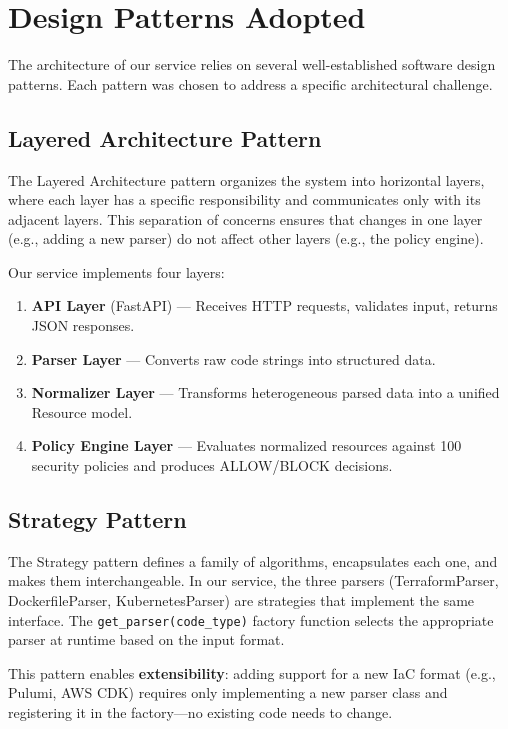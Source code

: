 \section{Design Patterns Adopted}

The architecture of our service relies on several well-established software design patterns. Each pattern was chosen to address a specific architectural challenge.

\subsection{Layered Architecture Pattern}

The Layered Architecture pattern organizes the system into horizontal layers, where each layer has a specific responsibility and communicates only with its adjacent layers. This separation of concerns ensures that changes in one layer (e.g., adding a new parser) do not affect other layers (e.g., the policy engine).

Our service implements four layers:
\begin{enumerate}
    \item \textbf{API Layer} (FastAPI) — Receives HTTP requests, validates input, returns JSON responses.
    \item \textbf{Parser Layer} — Converts raw code strings into structured data.
    \item \textbf{Normalizer Layer} — Transforms heterogeneous parsed data into a unified Resource model.
    \item \textbf{Policy Engine Layer} — Evaluates normalized resources against 100 security policies and produces ALLOW/BLOCK decisions.
\end{enumerate}

\subsection{Strategy Pattern}

The Strategy pattern defines a family of algorithms, encapsulates each one, and makes them interchangeable. In our service, the three parsers (TerraformParser, DockerfileParser, KubernetesParser) are strategies that implement the same interface. The \texttt{get\_parser(code\_type)} factory function selects the appropriate parser at runtime based on the input format.

This pattern enables \textbf{extensibility}: adding support for a new IaC format (e.g., Pulumi, AWS CDK) requires only implementing a new parser class and registering it in the factory—no existing code needs to change.

